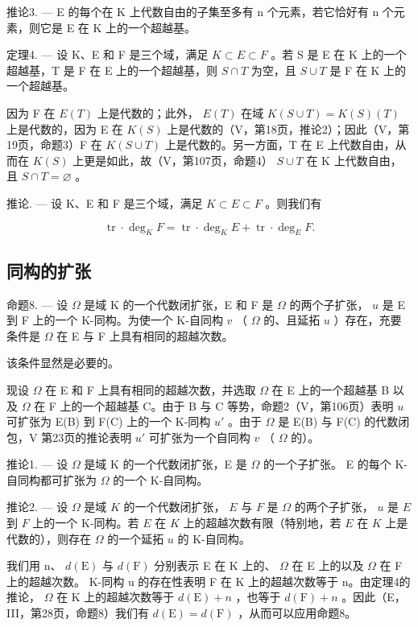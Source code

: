推论3. --- E 的每个在 K 上代数自由的子集至多有 n 个元素，若它恰好有 n 个元素，则它是 E 在 K 上的一个超越基。

定理4. --- 设 K、E 和 F 是三个域，满足 \(K \subset E \subset F\) 。若 S 是 E 在 K 上的一个超越基，T 是 F 在 E 上的一个超越基，则 \(S \cap T\) 为空，且 \(S \cup T\) 是 F 在 K 上的一个超越基。

因为 F 在 \(E(T)\) 上是代数的；此外， \(E(T)\) 在域 \(K(S \cup T) = K(S)(T)\) 上是代数的，因为 E 在 \(K(S)\) 上是代数的（V，第18页，推论2）；因此（V，第19页，命题3）F 在 \(K(S \cup T)\) 上是代数的。另一方面，T 在 E 上代数自由，从而在 \(K(S)\) 上更是如此，故（V，第107页，命题4） \(S \cup T\) 在 K 上代数自由，且 \(S \cap T = \varnothing\) 。

推论. --- 设 K、E 和 F 是三个域，满足 \(K \subset E \subset F\) 。则我们有

\[
\operatorname{tr} \cdot \deg_ {K} F = \operatorname{tr} \cdot \deg_ {K} E + \operatorname{tr} \cdot \deg_ {E} F.\tag{1}
\]

\subsection{同构的扩张}

命题8. --- 设 \(\Omega\) 是域 K 的一个代数闭扩张，E 和 F 是 \(\Omega\) 的两个子扩张， \(u\) 是 E 到 F 上的一个 K-同构。为使一个 K-自同构 \(v\) （ \(\Omega\) 的、且延拓 \(u\) ）存在，充要条件是 \(\Omega\) 在 E 与 F 上具有相同的超越次数。

该条件显然是必要的。

现设 \(\Omega\) 在 E 和 F 上具有相同的超越次数，并选取 \(\Omega\) 在 E 上的一个超越基 B 以及 \(\Omega\) 在 F 上的一个超越基 C。由于 B 与 C 等势，命题2（V，第106页）表明 \(u\) 可扩张为 E(B) 到 F(C) 上的一个 K-同构 \(u'\) 。由于 \(\Omega\) 是 E(B) 与 F(C) 的代数闭包，V 第23页的推论表明 \(u'\) 可扩张为一个自同构 \(v\) （ \(\Omega\) 的）。

推论1. --- 设 \(\Omega\) 是域 K 的一个代数闭扩张，E 是 \(\Omega\) 的一个子扩张。 E 的每个 K-自同构都可扩张为 \(\Omega\) 的一个 K-自同构。

推论2. --- 设 \(\Omega\) 是域 \(K\) 的一个代数闭扩张， \(E\) 与 \(F\) 是 \(\Omega\) 的两个子扩张， \(u\) 是 \(E\) 到 \(F\) 上的一个 K-同构。若 \(E\) 在 \(K\) 上的超越次数有限（特别地，若 \(E\) 在 \(K\) 上是代数的），则存在 \(\Omega\) 的一个延拓 \(u\) 的 K-自同构。

我们用 n、 \(d(\mathrm{E})\) 与 \(d(\mathrm{F})\) 分别表示 E 在 K 上的、 \(\Omega\) 在 E 上的以及 \(\Omega\) 在 F 上的超越次数。 K-同构 u 的存在性表明 F 在 K 上的超越次数等于 n。由定理4的推论， \(\Omega\) 在 K 上的超越次数等于 \(d(\mathrm{E}) + n\) ，也等于 \(d(\mathrm{F}) + n\) 。因此（E，III，第28页，命题8）我们有 \(d(\mathrm{E}) = d(\mathrm{F})\) ，从而可以应用命题8。

